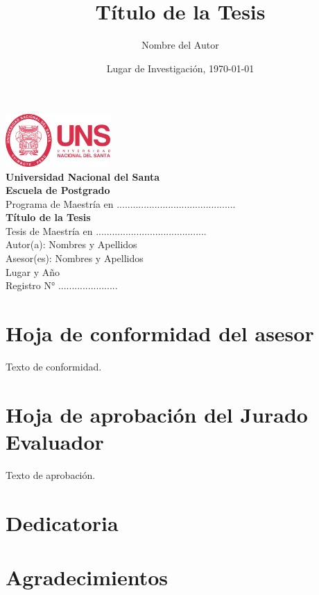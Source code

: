 \documentclass[12pt]{../componentes/uns}
\title{Título de la Tesis}
\author{Nombre del Autor}
\date{Lugar de Investigación, \today}
\begin{document}
\begin{titlepage}
    \centering
    \includegraphics[width=0.3\textwidth]{../componentes/logo_uns.png} \\
    \vspace{1cm}
    \textbf{\Large Universidad Nacional del Santa}\\
    \textbf{\large Escuela de Postgrado}\\
    Programa de Maestría en ............................................ \\
    \vspace{2cm}
    \textbf{\LARGE Título de la Tesis}\\
    \vspace{2cm}
    Tesis de Maestría en .........................................\\
    Autor(a): Nombres y Apellidos\\
    Asesor(es): Nombres y Apellidos\\
    \vfill
    Lugar y Año\\
    Registro N° ......................\\
\end{titlepage}

\newpage
\thispagestyle{empty}
\mbox{}

\newpage
\section*{Hoja de conformidad del asesor}
Texto de conformidad.

\newpage
\section*{Hoja de aprobación del Jurado Evaluador}
Texto de aprobación.

\newpage
\section*{Dedicatoria}
\lipsum[1] %

\newpage
\section*{Agradecimientos}
\lipsum[2] %
\end{document}
